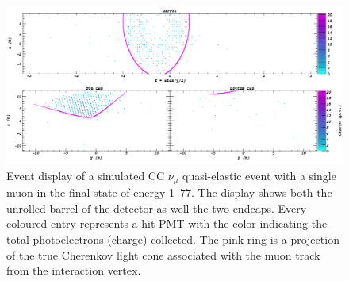 \begin{figure} %
    \includegraphics[width=\textwidth]{diagrams/4-chips/sim_event.png}
    \caption[sim event short]
    {Event display of a simulated CC $\nu_{\mu}$ quasi-elastic event with a single muon in the
        final state of energy \unit{1.77}{\GeV}. The display shows both the unrolled barrel of the
        \chipsfive detector as well the two endcaps. Every coloured entry represents a hit PMT
        with the color indicating the total photoelectrons (charge) collected. The pink ring is a
        projection of the true Cherenkov light cone associated with the muon track from the
        interaction vertex.}
    \label{fig:sim_event}
\end{figure}
